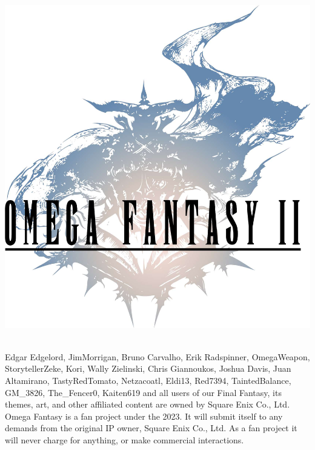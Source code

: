 \documentclass[a4paper, titlepage, twocolumn]{article}
\begin{document}
{
\begin{titlepage}	
	\begin{center}
	\includegraphics[width=0.9\columnwidth]{./art/images/title.jpg}
	\vspace*{2cm}\\
	\large
	\parbox[c]{0.9\columnwidth}{
	}
	\vspace*{\fill}\\
	\small
	 Edgar Edgelord, JimMorrigan, Bruno Carvalho, Erik Radspinner, OmegaWeapon, StorytellerZeke, Kori,
	Wally Zielinski, Chris Giannoukos, Joshua Davis, Juan Altamirano, TastyRedTomato, Netzacoatl, Eldi13, Red7394, TaintedBalance, GM\_3826, The\_Fencer0, Kaiten619 and all users of our \href{https://discordapp.com/invite/F5fpxMs}{}\ofrow
	Final Fantasy, its themes, art, and other affiliated content are owned by Square Enix Co., Ltd. 
	Omega Fantasy is a fan project under the \href{https://creativecommons.org/licenses/by-nc-sa/4.0/}{} 2023. 
	It will submit itself to any demands from the original IP owner, Square Enix Co., Ltd. As a fan project it will never charge for anything, or make commercial interactions.
	\end{center}
\end{titlepage}
%
}
%
\clearpage
{}
%






%
\end{document}
